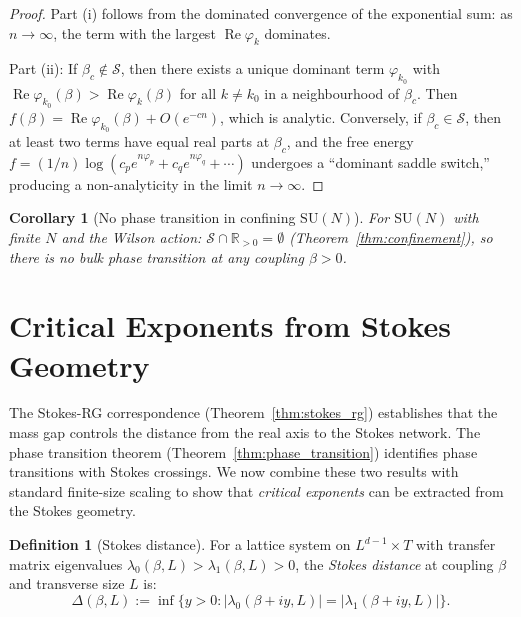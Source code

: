 \documentclass[12pt]{article}
\newtheorem{corollary}[theorem]{Corollary}
\theoremstyle{definition}
\newtheorem{definition}[theorem]{Definition}
\theoremstyle{remark}
\newcommand{\SU}{\mathrm{SU}}
\newcommand{\re}{\operatorname{Re}}
\newcommand{\R}{\mathbb{R}}
\begin{document}
\begin{proof}
Part (i) follows from the dominated convergence of the exponential
sum: as $n \to \infty$, the term with the largest $\re\varphi_k$
dominates.

Part (ii): If $\beta_c \notin \mathcal{S}$, then there exists a
unique dominant term $\varphi_{k_0}$ with
$\re\varphi_{k_0}(\beta) > \re\varphi_k(\beta)$ for all $k \ne k_0$
in a neighbourhood of $\beta_c$.  Then $f(\beta) = \re\varphi_{k_0}(\beta)
+ O(e^{-cn})$, which is analytic.  Conversely, if
$\beta_c \in \mathcal{S}$, then at least two terms have equal real
parts at $\beta_c$, and the free energy
$f = (1/n)\log(c_p e^{n\varphi_p} + c_q e^{n\varphi_q} + \cdots)$
undergoes a ``dominant saddle switch,'' producing a non-analyticity
in the limit $n \to \infty$.
\end{proof}

\begin{corollary}[No phase transition in confining $\SU(N)$]
For $\SU(N)$ with finite $N$ and the Wilson action:
$\mathcal{S} \cap \R_{>0} = \emptyset$
(Theorem~\ref{thm:confinement}), so there is no bulk phase
transition at any coupling $\beta > 0$.
\end{corollary}

\section{Critical Exponents from Stokes Geometry}
\label{sec:critical_exponents}

The Stokes-RG correspondence (Theorem~\ref{thm:stokes_rg}) establishes
that the mass gap controls the distance from the real axis to the
Stokes network.  The phase transition theorem
(Theorem~\ref{thm:phase_transition}) identifies phase transitions
with Stokes crossings.  We now combine these two results with
standard finite-size scaling to show that \emph{critical exponents}
can be extracted from the Stokes geometry.

\begin{definition}[Stokes distance]
\label{def:stokes_distance}
For a lattice system on $L^{d-1} \times T$ with transfer matrix
eigenvalues $\lambda_0(\beta,L) > \lambda_1(\beta,L) > 0$, the
\emph{Stokes distance} at coupling $\beta$ and transverse size $L$
is:
\begin{equation}\label{eq:stokes_dist}
\Delta(\beta, L) := \inf\bigl\{y > 0 :
|\lambda_0(\beta + iy, L)| = |\lambda_1(\beta + iy, L)|\bigr\}.
\end{equation}
\end{definition}
\end{document}
